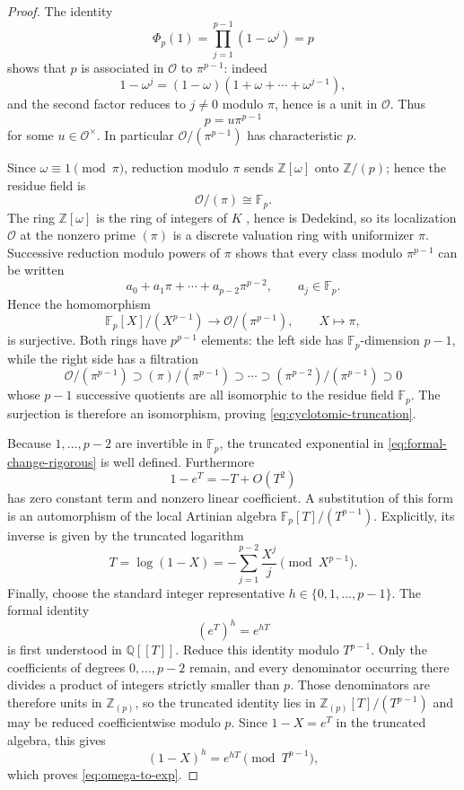 \documentclass[11pt]{article}
\newcommand{\F}{\mathbb F}
\begin{document}
\begin{proof}
The identity
\[
 \Phi_p(1)=\prod_{j=1}^{p-1}(1-\omega^j)=p
\]
shows that \(p\) is associated in \(\mathcal O\) to
\(\pi^{p-1}\): indeed
\[
 1-\omega^j
 =
 (1-\omega)(1+\omega+\cdots+\omega^{j-1}),
\]
and the second factor reduces to \(j\ne0\) modulo \(\pi\), hence is a
unit in \(\mathcal O\).  Thus
\[
 p=u\pi^{p-1}
\]
for some \(u\in\mathcal O^\times\).  In particular
\(\mathcal O/(\pi^{p-1})\) has characteristic \(p\).

Since \(\omega\equiv1\pmod\pi\), reduction modulo \(\pi\) sends
\(\mathbb Z[\omega]\) onto \(\mathbb Z/(p)\); hence the residue field is
\[
 \mathcal O/(\pi)\cong\F_p.
\]
The ring \(\mathbb Z[\omega]\) is the ring of integers of \(K\)
\cite[Ch.~2]{Washington}, hence is Dedekind, so its localization
\(\mathcal O\) at the nonzero prime \((\pi)\) is a discrete valuation ring
with uniformizer \(\pi\).
Successive reduction modulo powers of \(\pi\) shows that every class
modulo \(\pi^{p-1}\) can be written
\[
 a_0+a_1\pi+\cdots+a_{p-2}\pi^{p-2},
 \qquad a_j\in\F_p.
\]
Hence the homomorphism
\[
 \F_p[X]/(X^{p-1})
 \longrightarrow
 \mathcal O/(\pi^{p-1}),
 \qquad X\longmapsto\pi,
\]
is surjective.  Both rings have \(p^{p-1}\) elements: the left side has
\(\F_p\)-dimension \(p-1\), while the right side has a filtration
\[
 \mathcal O/(\pi^{p-1})
 \supset
 (\pi)/(\pi^{p-1})
 \supset\cdots\supset
 (\pi^{p-2})/(\pi^{p-1})
 \supset0
\]
whose \(p-1\) successive quotients are all isomorphic to the residue
field \(\F_p\).  The surjection is therefore an isomorphism, proving
\eqref{eq:cyclotomic-truncation}.

Because \(1,\ldots,p-2\) are invertible in \(\F_p\), the truncated
exponential in \eqref{eq:formal-change-rigorous} is well defined.
Furthermore
\[
 1-e^T=-T+O(T^2)
\]
has zero constant term and nonzero linear coefficient.  A substitution
of this form is an automorphism of the local Artinian algebra
\(\F_p[T]/(T^{p-1})\).  Explicitly, its inverse is given by the
truncated logarithm
\[
 T=\log(1-X)
 =
 -\sum_{j=1}^{p-2}\frac{X^j}{j}
 \pmod{X^{p-1}}.
\]
Finally, choose the standard integer representative
\(h\in\{0,1,\ldots,p-1\}\).  The formal identity
\[
 (e^T)^h=e^{hT}
\]
is first understood in \(\mathbb Q[[T]]\).  Reduce this identity modulo
\(T^{p-1}\).  Only the coefficients of degrees \(0,\ldots,p-2\) remain,
and every denominator occurring there divides a product of integers strictly
smaller than \(p\).  Those denominators are therefore units in
\(\mathbb Z_{(p)}\), so the truncated identity lies in
\(\mathbb Z_{(p)}[T]/(T^{p-1})\) and may be reduced coefficientwise modulo
\(p\).  Since \(1-X=e^T\) in the truncated algebra, this gives
\[
 (1-X)^h=e^{hT}\pmod{T^{p-1}},
\]
which proves \eqref{eq:omega-to-exp}.
\end{proof}
\end{document}

